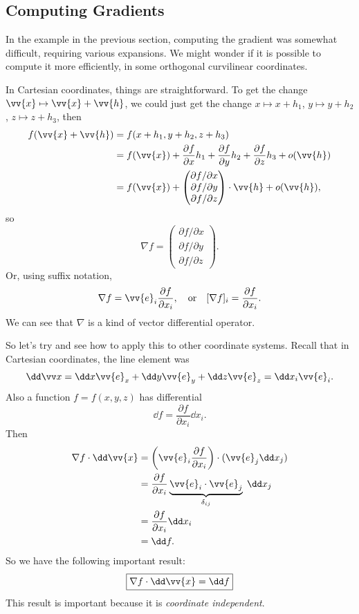  \subsection{Computing Gradients}

In the example in the previous section, computing the gradient was somewhat difficult, requiring various expansions. We might wonder if it is possible to compute it more efficiently, in some orthogonal curvilinear coordinates.

In Cartesian coordinates, things are straightforward.
To get the change $\vv{x} \mapsto \vv{x} + \vv{h}$, we could just get the change $x \mapsto x + h_1$, $y \mapsto y + h_2$, $z \mapsto z + h_3$, then
\begin{align*}
f(\vv{x} + \vv{h}) &= f(x + h_1, y + h_2, z + h_3) \\
				   &= f(\vv{x}) + \frac{\partial f}{\partial x} h_1 + \frac{\partial f}{\partial y} h_2  + \frac{\partial f}{\partial z} h_3 + o(\vv{h}) \\
				   &= f(\vv{x}) +  \begin{pmatrix}
					\partial f / \partial x \\
					\partial f / \partial y \\
					\partial f / \partial z 
				   \end{pmatrix} \cdot \vv{h} + o(\vv{h}),
\end{align*}
so
$$
\nabla f = \begin{pmatrix}
	\partial f / \partial x \\
	\partial f / \partial y \\
	\partial f / \partial z 
   \end{pmatrix}.
$$
Or, using suffix notation, 
$$
\nabla f = \vv{e}_i \frac{\partial f}{\partial x_i}, \quad \text{or} \quad [\nabla f]_i = \frac{\partial f}{\partial x_i}.
$$
We can see that $\nabla$ is a kind of vector differential operator.

So let's try and see how to apply this to other coordinate systems. Recall that in Cartesian coordinates, the line element was
$$
\dd \vv x = \dd x \vv{e}_x + \dd y \vv{e}_y + \dd z \vv{e}_z = \dd x_i \vv{e}_i.
$$
Also a function $f = f(x, y, z)$ has differential
$$
\dd f = \frac{\partial f}{\partial x_i} \dd x_i.
$$
Then
\begin{align*}
	\nabla f \cdot \dd \vv{x} &= \left(\vv{e}_i \frac{\partial f}{\partial x_i}\right) \cdot (\vv{e}_j \dd x_j) \\
	&= \frac{\partial f}{\partial x_i} \underbrace{\vv{e}_i \cdot \vv{e}_j}_{\delta_{ij}} \; \dd x_j \\
	&= \frac{\partial f}{\partial x_i} \dd x_i \\
	&= \dd f.
\end{align*}
So we have the following important result:
$$
\boxed{\nabla f \cdot \dd \vv{x} = \dd f}
$$
This result is important because it is \emph{coordinate independent}.

